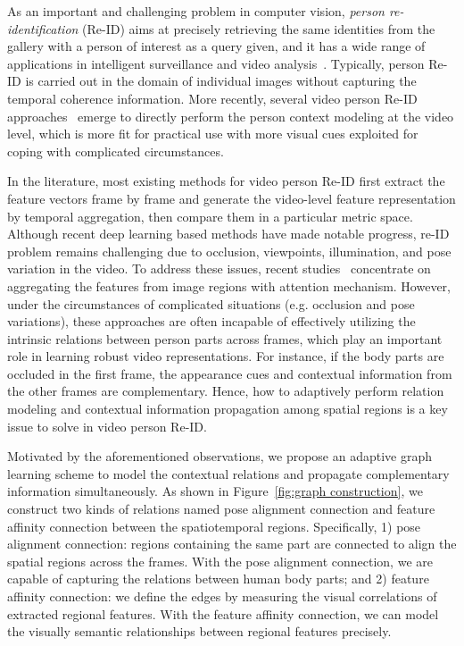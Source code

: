 \documentclass[journal]{IEEEtran}
\begin{document}
As an important and challenging problem in computer vision, \textit{person re-identification} (Re-ID) aims at precisely retrieving the same identities from the gallery with a person of interest as a query given, and it has a wide range of applications in intelligent surveillance and video analysis~\cite{Zajdel_2005_ICRA}. Typically, person Re-ID is carried out in the domain of individual images without capturing the temporal coherence information. More recently, several video person Re-ID approaches~\cite{McLaughlin_2016_CVPR,Zhou_2017_CVPR,Xu_2017_ICCV,Liu_2017_CVPR,Li_2018_CVPR,Chen_2018_CVPR,Si_2018_CVPR,Dai_2018_TIP,Wu_2019_TNNLS,Zhang_2019_TIP,Chen_2019_TIP,Liu_2019_AAAI,Li_2019_AAAI,Fu_2019_AAAI,Liu_2019_BMVC,Borgia_2019_WACV,Hou_2019_CVPR} emerge to directly perform the person context modeling at the video level, which is more fit for practical use with more visual cues exploited for coping with complicated circumstances.

In the literature, most existing methods for video person Re-ID first extract the feature vectors frame by frame and generate the video-level feature representation by temporal aggregation, then compare them in a particular metric space. Although recent deep learning based methods have made notable progress, re-ID problem remains challenging due to occlusion, viewpoints, illumination, and pose variation in the video. To address these issues, recent studies~\cite{Xu_2017_ICCV,Liu_2017_CVPR,Song_2018_AAAI,Li_2018_CVPR,Wu_2018_TMM} concentrate on aggregating the features from image regions with attention mechanism. However, under the circumstances of complicated situations (e.g. occlusion and pose variations), these approaches are often incapable of effectively utilizing the intrinsic relations between person parts across frames, which play an important role in learning robust video representations. For instance, if the body parts are occluded in the first frame, the appearance cues and contextual information from the other frames are complementary. Hence, how to adaptively perform relation modeling and contextual information propagation among spatial regions is a key issue to solve in video person Re-ID.

Motivated by the aforementioned observations, we propose an adaptive graph learning scheme to model the contextual relations and propagate complementary information simultaneously. As shown in Figure~\ref{fig:graph construction}, we construct two kinds of relations named pose alignment connection and feature affinity connection between the spatiotemporal regions. Specifically, 1) pose alignment connection: regions containing the same part are connected to align the spatial regions across the frames. With the pose alignment connection, we are capable of capturing the relations between human body parts; and 2) feature affinity connection: we define the edges by measuring the visual correlations of extracted regional features. With the feature affinity connection, we can model the visually semantic relationships between regional features precisely.
\end{document}

